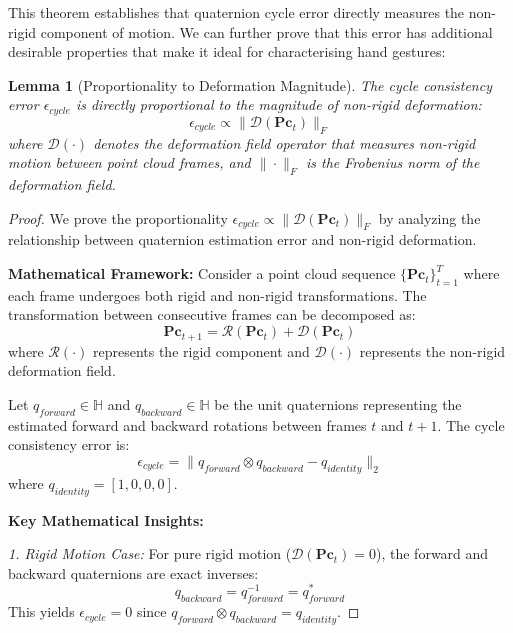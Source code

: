 \documentclass[journal]{IEEEtran}
\theoremstyle{plain}
\newtheorem{lemma}{Lemma}
\begin{document}
This theorem establishes that quaternion cycle error directly measures the non-rigid component of motion. We can further prove that this error has additional desirable properties that make it ideal for characterising hand gestures:
\begin{lemma}[Proportionality to Deformation Magnitude]
The cycle consistency error $\epsilon_{cycle}$ is directly proportional to the magnitude of non-rigid deformation:
\[\epsilon_{cycle} \propto \|\mathcal{D}(\mathbf{Pc}_t)\|_F\]
where $\mathcal{D}(\cdot)$ denotes the deformation field operator that measures non-rigid motion between point cloud frames, and $\|\cdot\|_F$ is the Frobenius norm of the deformation field.
\end{lemma}
\begin{proof}
We prove the proportionality $\epsilon_{cycle} \propto \|\mathcal{D}(\mathbf{Pc}_t)\|_F$ by analyzing the relationship between quaternion estimation error and non-rigid deformation.

\textbf{Mathematical Framework:}
Consider a point cloud sequence $\{\mathbf{Pc}_t\}_{t=1}^T$ where each frame undergoes both rigid and non-rigid transformations. The transformation between consecutive frames can be decomposed as:
\begin{equation}
\mathbf{Pc}_{t+1} = \mathcal{R}(\mathbf{Pc}_t) + \mathcal{D}(\mathbf{Pc}_t)
\end{equation}
where $\mathcal{R}(\cdot)$ represents the rigid component and $\mathcal{D}(\cdot)$ represents the non-rigid deformation field.

Let $q_{forward} \in \mathbb{H}$ and $q_{backward} \in \mathbb{H}$ be the unit quaternions representing the estimated forward and backward rotations between frames $t$ and $t+1$. The cycle consistency error is:
\begin{equation}
\epsilon_{cycle} = \|q_{forward} \otimes q_{backward} - q_{identity}\|_2
\end{equation}
where $q_{identity} = [1, 0, 0, 0]$.

\textbf{Key Mathematical Insights:}

\textit{1. Rigid Motion Case:} For pure rigid motion ($\mathcal{D}(\mathbf{Pc}_t) = 0$), the forward and backward quaternions are exact inverses:
\begin{equation}
q_{backward} = q_{forward}^{-1} = q_{forward}^*
\end{equation}
This yields $\epsilon_{cycle} = 0$ since $q_{forward} \otimes q_{backward} = q_{identity}$.


\end{proof}
\end{document}
